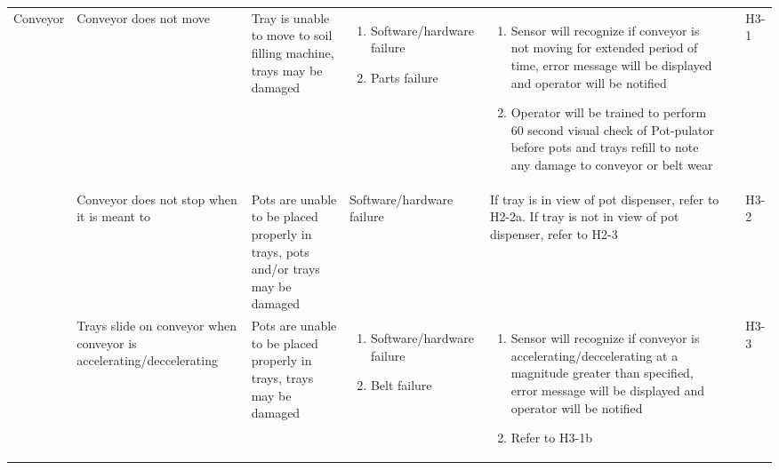 \documentclass{article}
\begin{document}
\begin{landscape}
\begin{center}
\begin{longtable}{|l|  p{3cm}  p{4cm}  p{4cm}  p{4cm}  p{1cm}  p{1cm}|}
        Conveyor &
        Conveyor does not move&
        Tray is unable to move to soil filling machine, trays may be damaged&
        \begin{enumerate}[label=(\alph*)]
            \item Software/hardware failure
            \item Parts failure
        \end{enumerate}&
        \begin{enumerate}[label=(\alph*)]
            \item Sensor will recognize if conveyor is not moving for extended period of time, error message will be displayed and operator will be notified
            \item Operator will be trained to perform 60 second visual check of Pot-pulator before pots and trays refill to note any damage to conveyor or belt wear
        \end{enumerate}&
        &
        H3-1\\
        &
        Conveyor does not stop when it is meant to&
        Pots are unable to be placed properly in trays, pots and/or trays may be damaged&
        Software/hardware failure&
        If tray is in view of pot dispenser, refer to H2-2a. If tray is not in view of pot dispenser, refer to H2-3&
        &
        H3-2\\
        &
        Trays slide on conveyor when conveyor is accelerating/deccelerating&
        Pots are unable to be placed properly in trays, trays may be damaged&
        \begin{enumerate}[label=(\alph*)]
            \item Software/hardware failure
            \item Belt failure
        \end{enumerate}&
        \begin{enumerate}[label=(\alph*)]
            \item Sensor will recognize if conveyor is accelerating/deccelerating at a magnitude greater than specified, error message will be displayed and operator will be notified
            \item Refer to H3-1b
        \end{enumerate}&
        &
        H3-3\\


\end{longtable}
\end{center}
\end{landscape}
\end{document}
